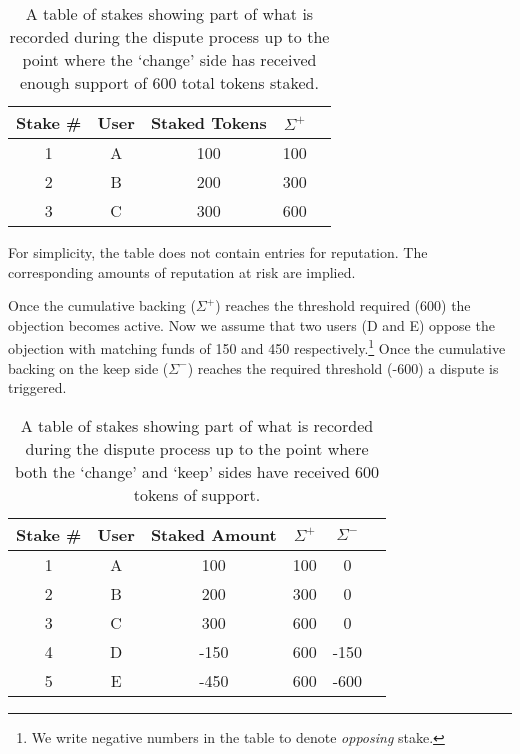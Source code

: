 \begin{table}[ht]
\centering
\caption{A table of stakes showing part of what is recorded during the dispute process up to the point where the `change' side has received enough support of 600 total tokens staked.}
\begin{tabular}{|c|c|c|c|c|}
\hline
\textbf{Stake \#} & \textbf{User}  & \textbf{Staked Tokens} & \textbf{$\Sigma^+$} \\ \hline
1 & A & 100           & 100                                                                                          \\ \hline
2 & B & 200           & 300                                                                                           \\ \hline
3 & C & 300           & 600                                                                                           \\ \hline
\end{tabular}
\end{table}
For simplicity, the table does not contain entries for reputation. The corresponding amounts of reputation at risk are implied.

Once the cumulative backing ($\Sigma^+$) reaches the threshold required (600) the objection becomes active. Now we assume that two users (D and E) oppose the objection with matching funds of 150 and 450 respectively.\footnote{We write negative numbers in the table to denote \emph{opposing} stake.} Once the cumulative backing on the keep side ($\Sigma^-$) reaches the required threshold (-600) a dispute is triggered.

\begin{table}[ht]
\centering
\caption{A table of stakes showing part of what is recorded during the dispute process up to the point where both the `change' and `keep' sides have received 600 tokens of support.}
\begin{tabular}{|c|c|c|c|c|c|}
\hline
Stake \# & User  & Staked Amount & $\Sigma^+$ & $\Sigma^-$ \\ \hline
1 & A & 100           & 100                      & 0                                                                       \\ \hline
2 & B & 200           & 300                      & 0                                                                       \\ \hline
3 & C & 300           & 600                      & 0                                                                       \\ \hline
4 & D & -150          & 600                      & -150                                                                    \\ \hline
5 & E & -450          & 600                      & -600                                                                    \\ \hline
\end{tabular}
\end{table}

